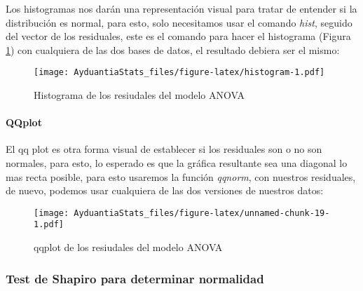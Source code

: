 \documentclass[]{book}
\newenvironment{Shaded}{\begin{snugshade}}{\end{snugshade}}
\newcommand{\KeywordTok}[1]{\textcolor[rgb]{0.13,0.29,0.53}{\textbf{#1}}}
\newcommand{\OperatorTok}[1]{\textcolor[rgb]{0.81,0.36,0.00}{\textbf{#1}}}
\newcommand{\NormalTok}[1]{#1}
\let\oldparagraph\paragraph
\renewcommand{\paragraph}[1]{\oldparagraph{#1}\mbox{}}
\begin{document}
Los histogramas nos darán una representación visual para tratar de
entender si la distribución es normal, para esto, solo necesitamos usar
el comando \emph{hist}, seguido del vector de los residuales, este es el
comando para hacer el histograma (Figura \ref{fig:histogram}) con
cualquiera de las dos bases de datos, el resultado debiera ser el mismo:

\begin{Shaded}
\end{Shaded}

\begin{figure}
\centering
\texttt{[image: AyduantiaStats\_files/figure-latex/histogram-1.pdf]}
\caption{\label{fig:histogram}Histograma de los resiudales del modelo ANOVA}
\end{figure}

\paragraph{QQplot}\label{qqplot}

El qq plot es otra forma visual de establecer si los residuales son o no
son normales, para esto, lo esperado es que la gráfica resultante sea
una diagonal lo mas recta posible, para esto usaremos la función
\emph{qqnorm}, con nuestros residuales, de nuevo, podemos usar
cualquiera de las dos versiones de nuestros datos:

\begin{Shaded}
\end{Shaded}

\begin{figure}
\centering
\texttt{[image: AyduantiaStats\_files/figure-latex/unnamed-chunk-19-1.pdf]}
\caption{\label{fig:unnamed-chunk-19}qqplot de los resiudales del modelo
ANOVA}
\end{figure}

\subsubsection{Test de Shapiro para determinar
normalidad}\label{test-de-shapiro-para-determinar-normalidad}
\end{document}

